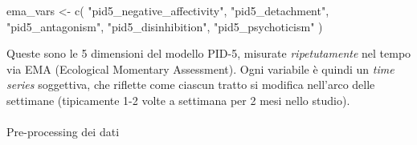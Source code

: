 \documentclass[
  11pt,
  a4paper,
  onecolumn]{article}
\makeatletter
\let\oldparagraph\paragraph
\renewcommand{\paragraph}{
    \@ifstar
      \xxxParagraphStar
      \xxxParagraphNoStar
  }
\newcommand{\xxxParagraphStar}[1]{\oldparagraph*{#1}\mbox{}}
\newcommand{\xxxParagraphNoStar}[1]{\oldparagraph{#1}\mbox{}}
\newenvironment{Shaded}{}{}
\newcommand{\FunctionTok}[1]{\textcolor[rgb]{0.44,0.26,0.76}{#1}}
\newcommand{\NormalTok}[1]{\textcolor[rgb]{0.14,0.16,0.18}{#1}}
\newcommand{\OtherTok}[1]{\textcolor[rgb]{0.44,0.26,0.76}{#1}}
\newcommand{\StringTok}[1]{\textcolor[rgb]{0.01,0.18,0.38}{#1}}
\makeatother
\begin{document}
\begin{Shaded}
\begin{Highlighting}[]
\NormalTok{ema\_vars }\OtherTok{\textless{}{-}} \FunctionTok{c}\NormalTok{(}
  \StringTok{"pid5\_negative\_affectivity"}\NormalTok{,}
  \StringTok{"pid5\_detachment"}\NormalTok{,}
  \StringTok{"pid5\_antagonism"}\NormalTok{,}
  \StringTok{"pid5\_disinhibition"}\NormalTok{,}
  \StringTok{"pid5\_psychoticism"}
\NormalTok{)}
\end{Highlighting}
\end{Shaded}

Queste sono le 5 dimensioni del modello PID-5, misurate
\emph{ripetutamente} nel tempo via EMA (Ecological Momentary
Assessment). Ogni variabile è quindi un \emph{time series} soggettiva,
che riflette come ciascun tratto si modifica nell'arco delle settimane
(tipicamente 1-2 volte a settimana per 2 mesi nello studio).

\paragraph{Pre-processing dei dati}\label{pre-processing-dei-dati}
\end{document}
